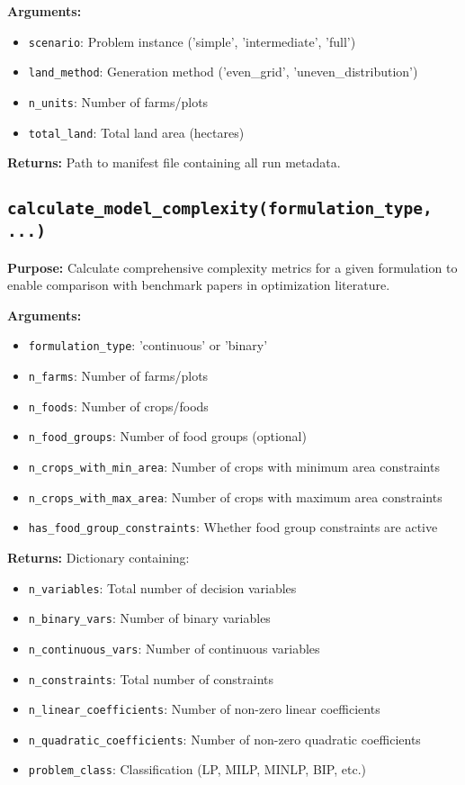 \documentclass{article}
\begin{document}
\textbf{Arguments:}
\begin{itemize}
    \item \texttt{scenario}: Problem instance ('simple', 'intermediate', 'full')
    \item \texttt{land\_method}: Generation method ('even\_grid', 'uneven\_distribution')
    \item \texttt{n\_units}: Number of farms/plots
    \item \texttt{total\_land}: Total land area (hectares)
\end{itemize}

\textbf{Returns:} Path to manifest file containing all run metadata.

\subsection{\texttt{calculate\_model\_complexity(formulation\_type, ...)}}

\textbf{Purpose:} Calculate comprehensive complexity metrics for a given formulation to enable comparison with benchmark papers in optimization literature.

\textbf{Arguments:}
\begin{itemize}
    \item \texttt{formulation\_type}: 'continuous' or 'binary'
    \item \texttt{n\_farms}: Number of farms/plots
    \item \texttt{n\_foods}: Number of crops/foods
    \item \texttt{n\_food\_groups}: Number of food groups (optional)
    \item \texttt{n\_crops\_with\_min\_area}: Number of crops with minimum area constraints
    \item \texttt{n\_crops\_with\_max\_area}: Number of crops with maximum area constraints
    \item \texttt{has\_food\_group\_constraints}: Whether food group constraints are active
\end{itemize}

\textbf{Returns:} Dictionary containing:
\begin{itemize}
    \item \texttt{n\_variables}: Total number of decision variables
    \item \texttt{n\_binary\_vars}: Number of binary variables
    \item \texttt{n\_continuous\_vars}: Number of continuous variables
    \item \texttt{n\_constraints}: Total number of constraints
    \item \texttt{n\_linear\_coefficients}: Number of non-zero linear coefficients
    \item \texttt{n\_quadratic\_coefficients}: Number of non-zero quadratic coefficients
    \item \texttt{problem\_class}: Classification (LP, MILP, MINLP, BIP, etc.)
\end{itemize}
\end{document}
